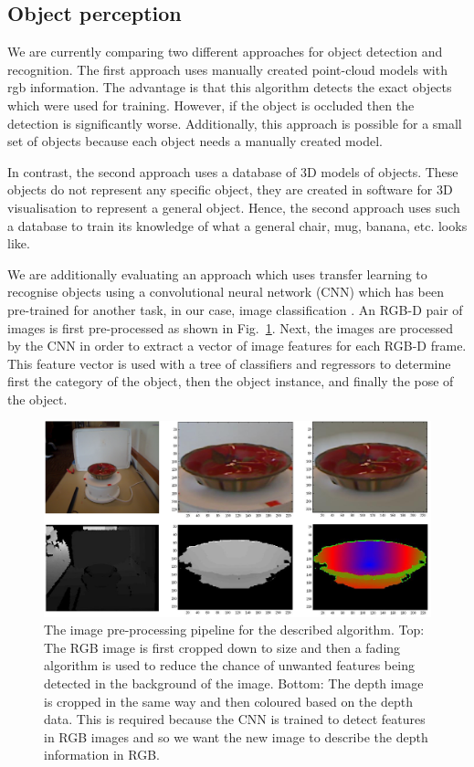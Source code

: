 \subsection{Object perception} 

We are currently comparing two different approaches for object detection and recognition. The first approach uses manually created point-cloud models with rgb information. 
The advantage is that this algorithm detects the exact objects which were used for training. 
However, if the object is occluded then the detection is significantly worse.
Additionally, this approach is possible for a small set of objects because each object needs a manually created model. 

In contrast, the second approach uses a database of 3D models of objects. These objects do not represent any specific object, they are created in software for 3D visualisation to represent a general object. 
Hence, the second approach uses such a database to train its knowledge of what a general chair, mug, banana, etc. looks like. 

We are additionally evaluating an approach which uses transfer learning to recognise objects using a convolutional neural network (CNN) which has been pre-trained for another task, in our case, image classification \cite{schwarz}. An RGB-D pair of images is first pre-processed as shown in Fig.~\ref{fig:object_perception}. Next, the images are processed by the CNN in order to extract a vector of image features for each RGB-D frame. This feature vector is used with a tree of classifiers and regressors to determine first the category of the object, then the object instance, and finally the pose of the object.

\begin{figure}[!htb]
\centering
\includegraphics[width=3.in]{object_perception.png}
\caption{The image pre-processing pipeline for the described algorithm. Top: The RGB image is first cropped down to size and then a fading algorithm is used to reduce the chance of unwanted features being detected in the background of the image. Bottom: The depth image is cropped in the same way and then coloured based on the depth data. This is required because the CNN is trained to detect features in RGB images and so we want the new image to describe the depth information in RGB.}
\label{fig:object_perception}
\end{figure}

